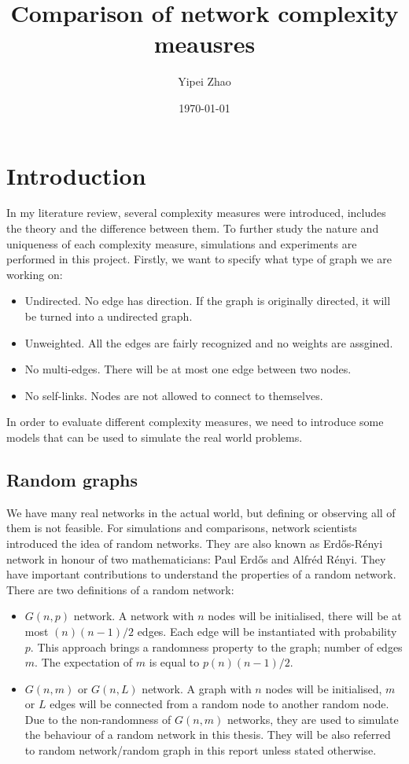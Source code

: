 \documentclass[12pt]{article}
\title{Comparison of network complexity meausres}
\author{Yipei Zhao}
\date{\today}
\begin{document}
\maketitle
\pagebreak

\tableofcontents
\pagebreak
\section{Introduction}
In my literature review\cite{litreview}, several complexity measures were introduced, includes the theory and the difference between them. To further study the nature and uniqueness of each complexity measure, simulations and experiments are performed in this project. Firstly, we want to specify what type of graph we are working on:
\begin{itemize}
    \item Undirected. No edge has direction. If the graph is originally directed, it will be turned into a undirected graph.
    \item Unweighted. All the edges are fairly recognized and no weights are assgined.
    \item No multi-edges. There will be at most one edge between two nodes.
    \item No self-links. Nodes are not allowed to connect to themselves. 
\end{itemize}
In order to evaluate different complexity measures, we need to introduce some models that can be used to simulate the real world problems.
\subsection{Random graphs}
We have many real networks in the actual world, but defining or observing all of them is not feasible. For simulations and comparisons, network scientists introduced the idea of random networks. They are also known as Erd\H{o}s-R\'{e}nyi network in honour of two mathematicians: Paul Erd\H{o}s and Alfr\'{e}d R\'{e}nyi. They have important contributions to understand the properties of a random network\cite{renyi1959random}.\\
\noindent
There are two definitions of a random network:
\begin{itemize}
    \item $G(n,p)$ network. A network with $n$ nodes will be initialised, there will be at most $(n)(n-1)/2$ edges. Each edge will be instantiated with probability $p$. This approach brings a randomness property to the graph; number of edges $m$. The expectation of $m$ is equal to $p(n)(n-1)/2$.
    \item $G(n,m)$ or $G(n,L)$ network. A graph with $n$ nodes will be initialised, $m$ or $L$ edges will be connected from a random node to another random node. Due to the non-randomness of $G(n,m)$ networks, they are used to simulate the behaviour of a random network in this thesis. They will be also referred to random network/random graph in this report unless stated otherwise.
\end{itemize}
\end{document}
